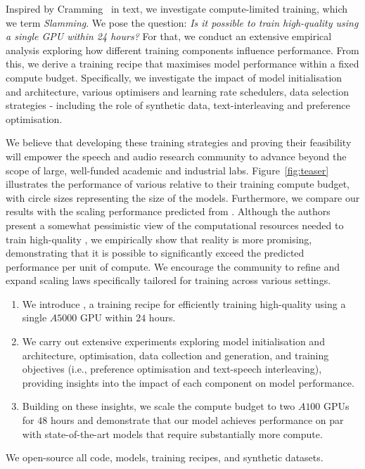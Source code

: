 Inspired by Cramming~\cite{geiping2023cramming} in text, we investigate compute-limited \slm training, which we term \emph{Slamming}. We pose the question: \emph{Is it possible to train high-quality \slms using a single GPU within 24 hours?} For that, we conduct an extensive empirical analysis exploring how different training components influence performance. From this, we derive a training recipe that maximises model performance within a fixed compute budget. Specifically, we investigate the impact of model initialisation and architecture, various optimisers and learning rate schedulers, data selection strategies - including the role of synthetic data, text-interleaving and preference optimisation. 

We believe that developing these training strategies and proving their feasibility will empower the speech and audio research community to advance \slms beyond the scope of large, well-funded academic and industrial labs. Figure~\ref{fig:teaser} illustrates the performance of various \slms relative to their training compute budget, with circle sizes representing the size of the models. Furthermore, we compare our results with the scaling performance predicted from \citet{cuervo2024scaling}. Although the authors present a somewhat pessimistic view of the computational resources needed to train high-quality \slms, we empirically show that reality is more promising, demonstrating that it is possible to significantly exceed the predicted performance per unit of compute. We encourage the community to refine and expand scaling laws specifically tailored for \slm training across various settings.

\begin{enumerate}
    \item We introduce \method, a training recipe for efficiently training high-quality \slms using a single $A5000$ GPU within $24$ hours.
    \item We carry out extensive experiments exploring model initialisation and architecture, optimisation, data collection and generation, and training objectives (i.e., preference optimisation and text-speech interleaving), providing insights into the impact of each component on model performance.
    \item Building on these insights, we scale the compute budget to two $A100$ GPUs for $48$ hours and demonstrate that our model achieves performance on par with state-of-the-art models that require substantially more compute.
\end{enumerate}
We open-source all code, models, training recipes, and synthetic datasets.